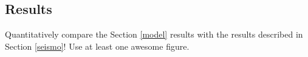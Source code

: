 \subsection{Results}\label{results}
Quantitatively compare the Section \ref{model} results with the \citet{gau14} results described in Section \ref{seismo}! Use at least one awesome figure.

%

